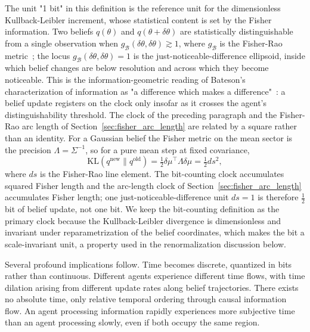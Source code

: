 \documentclass[11pt]{article}
\begin{document}
The unit "1 bit" in this definition is the reference unit for the dimensionless Kullback-Leibler increment, whose statistical content is set by the Fisher information. Two beliefs $q(\theta)$ and $q(\theta + \delta\theta)$ are statistically distinguishable from a single observation when $g_{\mathcal{B}}(\delta\theta, \delta\theta) \gtrsim 1$, where $g_{\mathcal{B}}$ is the Fisher-Rao metric~\cite{CoverThomas2006, AmariNagaoka2000}; the locus $g_{\mathcal{B}}(\delta\theta, \delta\theta) = 1$ is the just-noticeable-difference ellipsoid, inside which belief changes are below resolution and across which they become noticeable. This is the information-geometric reading of Bateson's characterization of information as "a difference which makes a difference"~\cite{Bateson1972}: a belief update registers on the clock only insofar as it crosses the agent's distinguishability threshold. The clock of the preceding paragraph and the Fisher-Rao arc length of Section~\ref{sec:fisher_arc_length} are related by a square rather than an identity. For a Gaussian belief the Fisher metric on the mean sector is the precision $\Lambda = \Sigma^{-1}$, so for a pure mean step at fixed covariance,
\begin{equation}
\mathrm{KL}(q^{\text{new}} \| q^{\text{old}}) = \tfrac{1}{2}\delta\mu^\top \Lambda \delta\mu = \tfrac{1}{2}ds^2,
\label{eq:kl_arclength}
\end{equation}
where $ds$ is the Fisher-Rao line element. The bit-counting clock accumulates squared Fisher length and the arc-length clock of Section~\ref{sec:fisher_arc_length} accumulates Fisher length; one just-noticeable-difference unit $ds = 1$ is therefore $\tfrac{1}{2}$ bit of belief update, not one bit. We keep the bit-counting definition as the primary clock because the Kullback-Leibler divergence is dimensionless and invariant under reparametrization of the belief coordinates, which makes the bit a scale-invariant unit, a property used in the renormalization discussion below.

Several profound implications follow. Time becomes discrete, quantized in bits rather than continuous. Different agents experience different time flows, with time dilation arising from different update rates along belief trajectories. There exists no absolute time, only relative temporal ordering through causal information flow. An agent processing information rapidly experiences more subjective time than an agent processing slowly, even if both occupy the same region.
\end{document}
